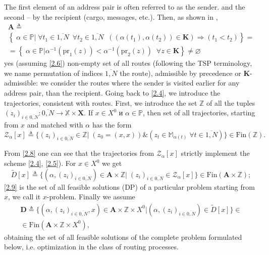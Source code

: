 \documentclass[10pt]{article}
\begin{document}
The first element of an address pair
is often referred to as the sender.
and the second -- by the recipient
(cargo, messages, etc.).
Then, as shown in \cite[part 2]{14},
\begin{multline}\label{2.7}
    \mathbf{A} {\triangleq} \\
    \left\{\;\alpha \in \mathbb{P} \vert\;
      \forall{t_1} \in \overline{1,N}\;\
      \forall{t_2}  \in \overline{1,N}\;\;
      ((\alpha(t_1),\alpha(t_2)) \in \mathbf{K})
      \Longrightarrow (t_1 < t_2)
    \right\} = \\
    =
    \left\{\;
      \alpha \in \mathbb{P} \vert
      \alpha^{-1}(\mathrm{pr}_1(z)) < \alpha^{-1}(\mathrm{pr}_2(z))\;\;\forall{z}
      \in \mathbf{K}
    \right\} \ne \varnothing
\end{multline}
yes
(assuming \eqref {2.6})
non-empty set of all routes
(following the TSP terminology,
we name permutation of indices $\overline {1, N}$
the route),
admissible by precedence or $\mathbf {K}$-admissible:
we consider the routes
where the sender is visited earlier for any address pair,
than the recipient.
Going back to \eqref {2.4},
we introduce the trajectories,
consistent with routes.
First, we introduce the set
$\mathbb{Z}$
of all the tuples
$(z_i)_{i \in \overline{0,N}}: \overline{0,N} \longrightarrow \mathbb{X} \times \mathbf{X}$.
If $x \in X^0$ и $\alpha \in \mathbb{P}$,
then
set of all trajectories,
starting from $ x $
and matched with $\alpha $
has the form
\begin{equation}\label{2.8}
\mathcal{Z}_\alpha[x] {\triangleq} \{(z_i)_{i \in \overline{0,N}}
\in \mathbb{Z} \vert\;(z_0 = (x,x)) \& (z_t \in \mathbb{M}_{\alpha(t)}\;\forall{t} \in \overline{1,N})\} \in \mathrm{Fin}(\mathbb{Z}).
\end{equation}

From \eqref {2.8}
one can see
that the trajectories from
$ \mathcal {Z}_\alpha[x] $
strictly implement the scheme
\eqref {2.4}, \eqref {2.5}).
For $x \in X^0$
we get
\begin{equation}\label{2.9}
  \tilde{D}[x] {\triangleq}
  \{(\alpha,(z_i)_{i \in \overline{0,N}}) \in \mathbf{A} \times \mathbb{Z}
  \vert \;(z_i)_{i \in \overline{0,N}} \in \mathcal{Z}_\alpha[x]\}
  \in \mathrm{Fin}(\mathbf{A} \times \mathbb{Z});
\end{equation}
\eqref{2.9}
is the set of all feasible solutions
(DP)
of a particular problem starting from $x$,
we call it $x$-problem.
Finally we assume
\begin{multline}\label{2.10}
  \mathbf{D} {\triangleq}
  \{(\alpha,(z_i)_{i \in \overline{0,N}},x) \in \mathbf{A} \times \mathbb{Z} \times X^0 \vert
  (\alpha,(z_i)_{i \in \overline{0,N}}) \in \tilde{D}[x]\}
  \in
  \\
  \in \mathrm{Fin}(\mathbf{A} \times \mathbb{Z} \times X^0),
\end{multline}
obtaining the set of all
feasible solutions of the complete problem formulated below,
i.e. optimization in the class of routing processes.
\end{document}
